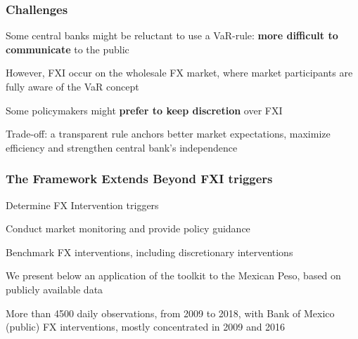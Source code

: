 \documentclass{beamer}
\newenvironment{largeitemize}{\itemize\addtolength{\itemsep}{10pt}}{\enditemize}
\newenvironment{largeenumerate}{\enumerate\addtolength{\itemsep}{10pt}}{\endenumerate}
\begin{document}
\begin{frame}
  \frametitle{Challenges}
  \begin{largeitemize}
      \item Some central banks might be reluctant to use a VaR-rule: \textbf{more
        difficult to communicate} to the public
        \begin{largeitemize}
      \item However, FXI occur on the wholesale FX market, where market
        participants are fully aware of the VaR concept
        \end{largeitemize}        
      \item Some policymakers might \textbf{prefer to keep discretion} over FXI
        \begin{largeitemize}
    \item Trade-off: a transparent rule anchors better market expectations,
      maximize efficiency and strengthen central bank's independence              
        \end{largeitemize}        
  \end{largeitemize}
\end{frame}

\begin{frame}
  \frametitle{The Framework Extends Beyond FXI triggers}    
  \begin{largeenumerate}
    \item Determine FX Intervention triggers
    \item Conduct market monitoring and provide policy guidance
    \item Benchmark FX interventions, including discretionary interventions
    \end{largeenumerate}
    
    \bigskip
    
  \begin{largeitemize}
    \item We present below an application of the toolkit to the Mexican Peso, based on publicly
      available data
    \item More than 4500 daily observations, from 2009 to 2018, with Bank of
      Mexico (public) FX interventions, mostly concentrated in 2009 and 2016
    \end{largeitemize}
    
\end{frame}


\end{document}
